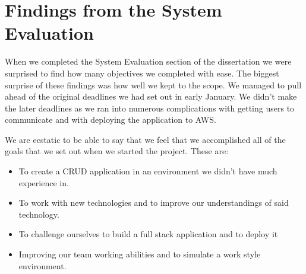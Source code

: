 \section{Findings from the System Evaluation}
When we completed the System Evaluation section of the dissertation we were surprised to find how many objectives we completed with ease. The biggest surprise of these findings was how well we kept to the scope. We managed to pull ahead of the original deadlines we had set out in early January. We didn't make the later deadlines as we ran into numerous complications with getting users to communicate and with deploying the application to AWS. \par
We are ecstatic to be able to say that we feel that we accomplished all of the goals that we set out when we started the project. These are:
\begin{itemize}
    \item To create a CRUD application in an environment we didn't have much experience in.
    \item To work with new technologies and to improve our understandings of said technology.
    \item To challenge ourselves to build a full stack application and to deploy it
    \item Improving our team working abilities and to simulate a work style environment.
\end{itemize}

